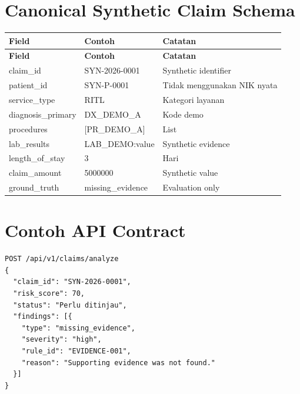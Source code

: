 \documentclass[11pt,a4paper]{article}
\begin{document}
\section{Canonical Synthetic Claim Schema}
\begin{longtable}{|p{4cm}|p{5cm}|p{6cm}|}
\hline
\rowcolor{blue!15} \textbf{Field} & \textbf{Contoh} & \textbf{Catatan} \\ \hline
\endfirsthead
\hline
\rowcolor{blue!15} \textbf{Field} & \textbf{Contoh} & \textbf{Catatan} \\ \hline
\endhead
claim\_id & SYN-2026-0001 & Synthetic identifier \\ \hline
patient\_id & SYN-P-0001 & Tidak menggunakan NIK nyata \\ \hline
service\_type & RITL & Kategori layanan \\ \hline
diagnosis\_primary & DX\_DEMO\_A & Kode demo \\ \hline
procedures & [PR\_DEMO\_A] & List \\ \hline
lab\_results & LAB\_DEMO:value & Synthetic evidence \\ \hline
length\_of\_stay & 3 & Hari \\ \hline
claim\_amount & 5000000 & Synthetic value \\ \hline
ground\_truth & missing\_evidence & Evaluation only \\ \hline
\end{longtable}
\section{Contoh API Contract}
\begin{verbatim}
POST /api/v1/claims/analyze
{
  "claim_id": "SYN-2026-0001",
  "risk_score": 70,
  "status": "Perlu ditinjau",
  "findings": [{
    "type": "missing_evidence",
    "severity": "high",
    "rule_id": "EVIDENCE-001",
    "reason": "Supporting evidence was not found."
  }]
}
\end{verbatim}
\end{document}
